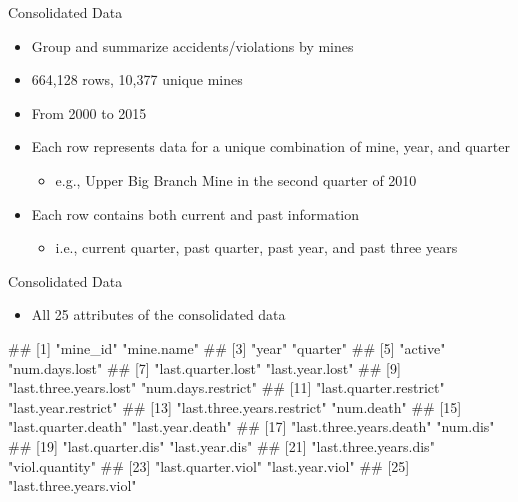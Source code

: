 \documentclass[
]{beamer}
\providecommand{\tightlist}{%
  \setlength{\itemsep}{0pt}\setlength{\parskip}{0pt}}
\let\oldverbatim\verbatim
\let\endoldverbatim\endverbatim
\renewenvironment{verbatim}{\footnotesize\oldverbatim}{\endoldverbatim}
\begin{document}
\begin{frame}{Consolidated Data}

\begin{itemize}
\tightlist
\item
  Group and summarize accidents/violations by mines
\item
  664,128 rows, 10,377 unique mines
\item
  From 2000 to 2015
\item
  Each row represents data for a unique combination of mine, year, and
  quarter

  \begin{itemize}
  \tightlist
  \item
    e.g., Upper Big Branch Mine in the second quarter of 2010
  \end{itemize}
\item
  Each row contains both current and past information

  \begin{itemize}
  \tightlist
  \item
    i.e., current quarter, past quarter, past year, and past three years
  \end{itemize}
\end{itemize}

\end{frame}

\begin{frame}[fragile]{Consolidated Data}

\begin{itemize}
\tightlist
\item
  All 25 attributes of the consolidated data
\end{itemize}

\begin{verbatim}
##  [1] "mine_id"                   "mine.name"                
##  [3] "year"                      "quarter"                  
##  [5] "active"                    "num.days.lost"            
##  [7] "last.quarter.lost"         "last.year.lost"           
##  [9] "last.three.years.lost"     "num.days.restrict"        
## [11] "last.quarter.restrict"     "last.year.restrict"       
## [13] "last.three.years.restrict" "num.death"                
## [15] "last.quarter.death"        "last.year.death"          
## [17] "last.three.years.death"    "num.dis"                  
## [19] "last.quarter.dis"          "last.year.dis"            
## [21] "last.three.years.dis"      "viol.quantity"            
## [23] "last.quarter.viol"         "last.year.viol"           
## [25] "last.three.years.viol"
\end{verbatim}

\end{frame}
\end{document}
